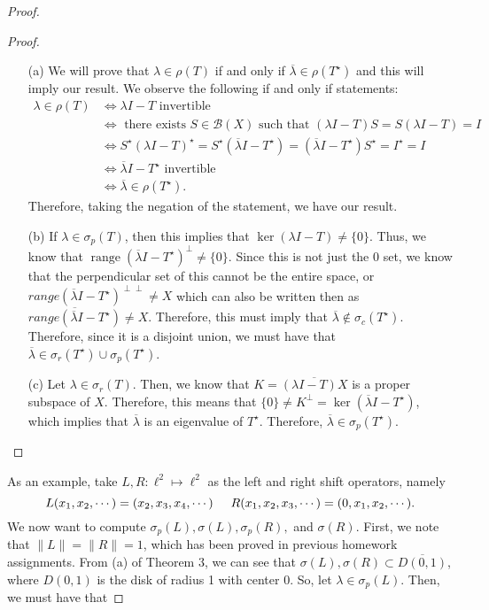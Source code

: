 \documentclass[oneside]{book}
\newcommand{\B}{\mathscr{B}}
\DeclareMathOperator{\range}{range}
\newcommand{\ov}{\overline}
\newcommand{\sbs}{\subset}
\newcommand{\Ts}{T^{\star}}
\begin{document}
\begin{proof}
\begin{proof}
\begin{enumerate}
\item[(a)] We will prove that $\lambda \in \rho(T)$ if and only if $\ov{\lambda} \in \rho(\Ts)$ and this will imply our result. We observe the following if and only if statements:
\begin{align*}
\lambda \in \rho(T) & \Longleftrightarrow \lambda I - T \text{ invertible } \\
&\Longleftrightarrow \text{ there exists } S \in \B(X) \text{ such that } (\lambda I - T)S = S(\lambda I - T) = I \\
& \Longleftrightarrow S^{\star}(\lambda I - T)^{\star} = S^{\star} (\ov{\lambda} I - \Ts) = (\ov{\lambda} I - \Ts) S^{\star} = I^{\star} = I \\
& \Longleftrightarrow \ov{\lambda} I - \Ts \text{ invertible } \\
& \Longleftrightarrow \ov{\lambda} \in \rho(\Ts).
\end{align*}
Therefore, taking the negation of the statement, we have our result. 
\item[(b)] If $\lambda \in \sigma_p(T)$, then this implies that $\ker(\lambda I - T) \neq \{ 0 \}$. Thus, we know that $\range(\ov{\lambda} I - \Ts)^{\perp} \neq \{ 0 \}$. Since this is not just the 0 set, we know that the perpendicular set of this cannot be the entire space, or $range(\ov{\lambda} I - \Ts)^{\perp \perp} \neq X$ which can also be written then as $\ov{range(\ov{\lambda} I - \Ts)} \neq X$. Therefore, this must imply that $\ov{\lambda} \not\in \sigma_c(\Ts)$. Therefore, since it is a disjoint union, we must have that $\ov{\lambda} \in \sigma_r(\Ts) \cup \sigma_p(\Ts)$.
\item[(c)] Let $\lambda \in \sigma_r(T)$. Then, we know that $K = \ov{(\lambda I - T) X}$ is a proper subspace of $X$. Therefore, this means that $\{ 0 \} \neq K^{\perp} = \ker(\ov{\lambda} I - \Ts)$, which implies that $\ov{\lambda}$ is an eigenvalue of $\Ts$. Therefore, $\ov{\lambda} \in \sigma_p(\Ts)$.  
\end{enumerate}
\end{proof}
As an example, take $L, R :\ell^2 \mapsto \ell^2$ as the left and right shift operators, namely
\[ L(x_1, x_2, \cdots) = (x_2, x_3, x_4, \cdots) \hspace{5mm} R(x_1, x_2, x_3, \cdots) = (0, x_1, x_2, \cdots).\]
We now want to compute $\sigma_p(L), \sigma(L), \sigma_p(R),$ and $\sigma(R)$. First, we note that $\| L \| = \| R \| = 1$, which has been proved in previous homework assignments. From (a) of Theorem 3, we can see that $\sigma(L), \sigma(R) \sbs \ov{D(0, 1)}$, where $D(0, 1)$ is the disk of radius 1 with center 0. So, let $\lambda \in \sigma_p(L)$. Then, we must have that 

\end{proof}
\end{document}

